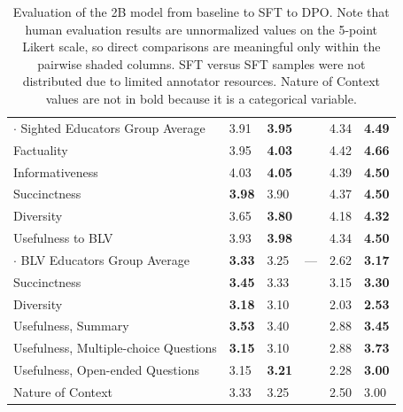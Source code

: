 \begin{landscape}
\begin{table}
\begin{tabular}{l>{\columncolor{gray!15}}l>{\columncolor{gray!15}}lll>{\columncolor{gray!15}}l>{\columncolor{gray!15}}l}
        $\cdot$ Sighted Educators Group Average & 3.91 & \textbf{3.95} & & & 4.34 & \textbf{4.49} \\
        Factuality                              & 3.95 & \textbf{4.03} & & & 4.42 & \textbf{4.66} \\
        Informativeness                         & 4.03 & \textbf{4.05} & & & 4.39 & \textbf{4.50} \\
        Succinctness                            & \textbf{3.98} & 3.90 & & & 4.37 & \textbf{4.50} \\
        Diversity                               & 3.65 & \textbf{3.80} & & & 4.18 & \textbf{4.32} \\
        Usefulness to BLV                       & 3.93 & \textbf{3.98} & & & 4.34 & \textbf{4.50} \\

        $\cdot$ BLV Educators Group Average     & \textbf{3.33} & 3.25 & \multicolumn{2}{c}{---} & 2.62 & \textbf{3.17} \\
        Succinctness                            & \textbf{3.45} & 3.33 & & & 3.15 & \textbf{3.30} \\
        Diversity                               & \textbf{3.18} & 3.10 & & & 2.03 & \textbf{2.53} \\
        Usefulness, Summary                     & \textbf{3.53} & 3.40 & & & 2.88 & \textbf{3.45} \\
        Usefulness, Multiple-choice Questions   & \textbf{3.15} & 3.10 & & & 2.88 & \textbf{3.73} \\
        Usefulness, Open-ended Questions        & 3.15 & \textbf{3.21} & & & 2.28 & \textbf{3.00} \\
        Nature of Context                       & 3.33 & 3.25 & & & 2.50 & 3.00 \\
                                    
    \bottomrule
    \end{tabular}
\caption{Evaluation of the 2B model from baseline to SFT to DPO. Note that human evaluation results are unnormalized values on the 5-point Likert scale, so direct comparisons are meaningful only within the pairwise shaded columns. SFT versus SFT samples were not distributed due to limited annotator resources. Nature of Context values are not in bold because it is a categorical variable.}\label{tab:big2B}
\end{table}
\end{landscape}

